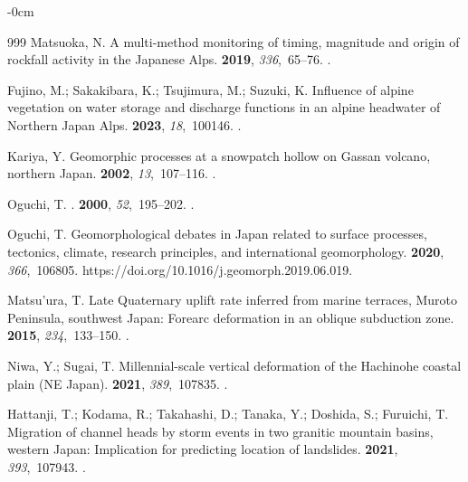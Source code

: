 \documentclass[land,article,accept,pdftex,moreauthors]{Definitions/mdpi}
\begin{document}
\begin{adjustwidth}{-\extralength}{0cm}
\begin{thebibliography}{999}
Matsuoka, N.
\newblock A multi-method monitoring of timing, magnitude and origin of rockfall
  activity in the Japanese Alps.
 {\bf 2019}, {\em 336},~65--76.
.

Fujino, M.; Sakakibara, K.; Tsujimura, M.; Suzuki, K.
\newblock Influence of alpine vegetation on water storage and discharge
  functions in an alpine headwater of Northern Japan Alps.
 {\bf 2023}, {\em 18},~100146.
.

Kariya, Y.
\newblock Geomorphic processes at a snowpatch hollow on Gassan volcano,
  northern Japan.
 {\bf 2002}, {\em
  13},~107--116.
.

Oguchi, T.
.
 {\bf 2000}, {\em 52},~195--202.\linebreak
{}.

Oguchi, T.
\newblock Geomorphological debates in Japan related to surface processes,
  tectonics, climate, research principles, and international geomorphology.
 {\bf 2020}, {\em 366},~106805.
 {{https://doi.org/10.1016/j.geomorph.2019.06.019}}.

Matsu'ura, T.
\newblock Late Quaternary uplift rate inferred from marine terraces, Muroto
  Peninsula, southwest Japan: Forearc deformation in an oblique subduction
  zone.
 {\bf 2015}, {\em 234},~133--150.
.

Niwa, Y.; Sugai, T.
\newblock Millennial-scale vertical deformation of the Hachinohe coastal plain
  (NE Japan).
 {\bf 2021}, {\em 389},~107835.
.

Hattanji, T.; Kodama, R.; Takahashi, D.; Tanaka, Y.; Doshida, S.; Furuichi, T.
\newblock Migration of channel heads by storm events in two granitic mountain
  basins, western Japan: Implication for predicting location of landslides.
 {\bf 2021}, {\em 393},~107943.
.


\end{thebibliography}
\end{adjustwidth}
\end{document}
